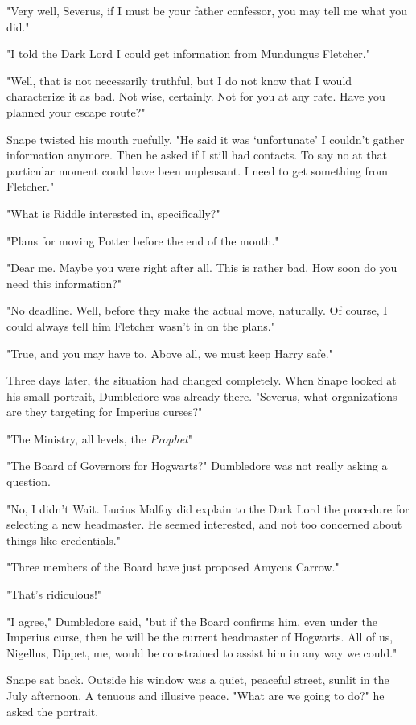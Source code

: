 "Very well, Severus, if I must be your father confessor, you may tell me what you did."

"I told the Dark Lord I could get information from Mundungus Fletcher."

"Well, that is not necessarily truthful, but I do not know that I would characterize it as bad. Not wise, certainly. Not for you at any rate. Have you planned your escape route?"

Snape twisted his mouth ruefully. "He said it was `unfortunate' I couldn't gather information anymore. Then he asked if I still had contacts. To say no at that particular moment could have been{\el} unpleasant. I need to get something from Fletcher."

"What is Riddle interested in, specifically?"

"Plans for moving Potter before the end of the month."

"Dear me. Maybe you were right after all. This is rather bad. How soon do you need this information?"

"No deadline. Well, before they make the actual move, naturally. Of course, I could always tell him Fletcher wasn't in on the plans."

"True, and you may have to. Above all, we must keep Harry safe."

Three days later, the situation had changed completely. When Snape looked at his small portrait, Dumbledore was already there. "Severus, what organizations are they targeting for Imperius curses?"

"The Ministry, all levels, the \emph{Prophet}{\el}"

"The Board of Governors for Hogwarts?" Dumbledore was not really asking a question.

"No, I didn't{\el} Wait. Lucius Malfoy did explain to the Dark Lord the procedure for selecting a new headmaster. He seemed interested, and not too concerned about things like credentials."

"Three members of the Board have just proposed Amycus Carrow."

"That's ridiculous!"

"I agree," Dumbledore said, "but if the Board confirms him, even under the Imperius curse, then he will be the current headmaster of Hogwarts. All of us, Nigellus, Dippet, me, would be constrained to assist him in any way we could."

Snape sat back. Outside his window was a quiet, peaceful street, sunlit in the July afternoon. A tenuous and illusive peace. "What are we going to do?" he asked the portrait.

